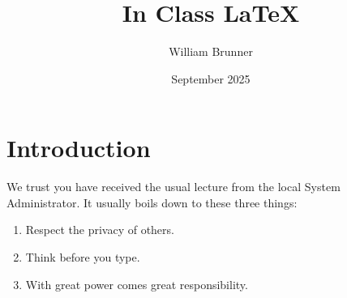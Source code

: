 \documentclass{article}
\title{In Class LaTeX}
\author{William Brunner}
\date{September 2025}
\begin{document}
\maketitle

\section{Introduction}

We trust you have received the usual lecture from the local System 
Administrator. It usually boils down to these three things:

\begin{enumerate}
    \item Respect the privacy of others.
    \item Think before you type.
    \item With great power comes great responsibility. \cite{askubuntu2023}
    \cite{overleaf2023}
\end{enumerate}

\printbibliography
\end{document}
